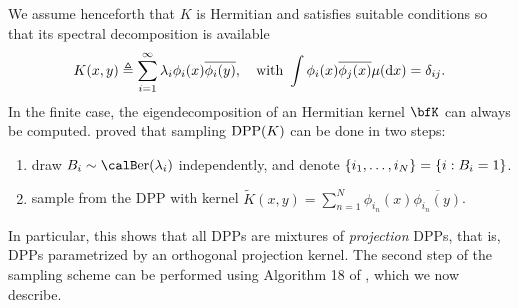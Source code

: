 \documentclass[twoside,11pt]{article}
\begin{document}
      We assume henceforth that $K$ is Hermitian and satisfies suitable conditions \cite[Theorem 3]{Sos00} so that its spectral decomposition is available
      \begin{equation}
      \label{eq:eigdec_kernel}
        K(x,y)\triangleq\sum\limits_{i=1}^{\infty} \lambda_i \phi_i(x) \overline{\phi_i(y)},
        \quad \text{with }
        \int \phi_i(x) \overline{\phi_j(x)} \mu(\mathop{}\!\mathrm{d} x) = \delta_{ij}.
      \end{equation}
      In the finite case, the eigendecomposition of an Hermitian kernel $\bfK$ can always be computed.
      \noindent\citet[Theorem 7]{HKPV06} proved that sampling $\operatorname{DPP}(K)$ can be done in two steps:
      \begin{enumerate}
        \item draw $B_i\sim\Ber(\lambda_i)$ independently, and denote $\left\{ i_1,\dots,i_{N} \right\} = \left\{ i:B_i=1 \right\}$.
        \item sample from the DPP with kernel $\tilde{K}(x,y) = \sum_{n=1}^{N}\phi_{i_n}(x) \overline{\phi_{i_n}(y)}$.
      \end{enumerate}
      In particular, this shows that all DPPs are mixtures of \emph{projection} DPPs, that is, DPPs parametrized by an orthogonal projection kernel.
      The second step of the sampling scheme can be performed using Algorithm 18 of \cite{HKPV06}, which we now describe.
\end{document}
